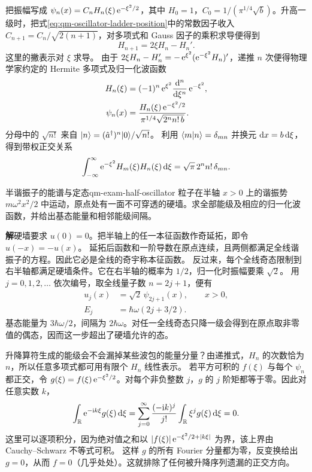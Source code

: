 把振幅写成 $\psi_n(x) = C_n H_n(\xi)\e^{-\xi^2/2}$，其中 $H_0 = 1$，$C_0 = 1/(\pi^{1/4}\sqrt b)$。升高一级时，把式\eqref{eq:qm-oscillator-ladder-position}中的常数因子收入 $C_{n+1} = C_n/\sqrt{2(n+1)}$，对多项式和 Gauss 因子的乘积求导便得到
\begin{equation}
    H_{n+1} = 2\xi H_n - H_n'.
\end{equation}
这里的撇表示对 $\xi$ 求导。
由于 $2\xi H_n - H_n' = -\e^{\xi^2}(\e^{-\xi^2}H_n)'$，递推 $n$ 次便得物理学家约定的 Hermite 多项式及归一化波函数
\begin{subequations}
    \begin{align}
        H_n(\xi) &= (-1)^n\e^{\xi^2}\dd[n]{\xi}\e^{-\xi^2},\\
        \psi_n(x) &= \frac{H_n(\xi)\e^{-\xi^2/2}}{\pi^{1/4}\sqrt{2^n n!\,b}} .
    \end{align}
\end{subequations}
分母中的 $\sqrt{n!}$ 来自 $\ket n = (\op a\adjoint)^n\ket 0/\sqrt{n!}$。
利用 $\braket{m}{n} = \delta_{mn}$ 并换元 $\d x = b\d\xi$，得到带权正交关系
\begin{equation}\label{eq:qm-hermite-orthogonality}
    \intR \e^{-\xi^2}H_m(\xi)H_n(\xi)\d\xi
       = \sqrt\pi\,2^n n!\,\delta_{mn}.
\end{equation}

\begin{example}{半谐振子的能谱与定态}{qm-exam-half-oscillator}
    粒子在半轴 $x > 0$ 上的谐振势 $m\omega^2x^2/2$ 中运动，原点处有一面不可穿透的硬墙。求全部能级及相应的归一化波函数，并给出基态能量和相邻能级间隔。

    \par\smallskip\textbf{解}\quad 硬墙要求 $u(0) = 0$。把半轴上的任一本征函数作奇延拓，即令 $u(-x) = -u(x)$。
    延拓后函数和一阶导数在原点连续，且两侧都满足全线谐振子的方程。因此它必是全线的奇宇称本征函数。
    反过来，每个全线奇态限制到右半轴都满足硬墙条件。它在右半轴的概率为 $1/2$，归一化时振幅要乘 $\sqrt 2$。
    用 $j = 0,1,2,\ldots$ 依次编号，取全线量子数 $n = 2j + 1$，便有
    \begin{align*}
        u_j(x) &= \sqrt 2\,\psi_{2j+1}(x), \qquad x > 0,\\
        E_j &= \hbar\omega(2j + 3/2).
    \end{align*}
    基态能量为 $3\hbar\omega/2$，间隔为 $2\hbar\omega$。对任一全线奇态只降一级会得到在原点取非零值的偶态，因而这一步超出了硬墙允许的态。
\end{example}

\label{ss:qm-oscillator-completeness}
升降算符生成的能级会不会漏掉某些波包的能量分量？由递推式，$H_n$ 的次数恰为 $n$，所以任意多项式都可用有限个 $H_n$ 线性表示。
若平方可积的 $f(\xi)$ 与每个 $\psi_n$ 都正交，令 $g(\xi) = f(\xi)\e^{-\xi^2/2}$。对每个非负整数 $j$，$g$ 的 $j$ 阶矩都等于零。因此对任意实数 $k$，
\[
    \int_{\RR}\e^{-\i k\xi}g(\xi)\d\xi
       = \sum_{j=0}^{\infty}\frac{(-\i k)^j}{j!}
          \int_{\RR}\xi^j g(\xi)\d\xi = 0 .
\]
这里可以逐项积分，因为绝对值之和以 $\abs{f(\xi)}\e^{-\xi^2/2+\abs{k\xi}}$ 为界，该上界由 Cauchy--Schwarz 不等式可积。
这样 $g$ 的所有 Fourier 分量都为零，反变换给出 $g = 0$，从而 $f = 0$（几乎处处）。这就排除了任何被升降序列遗漏的正交方向。

